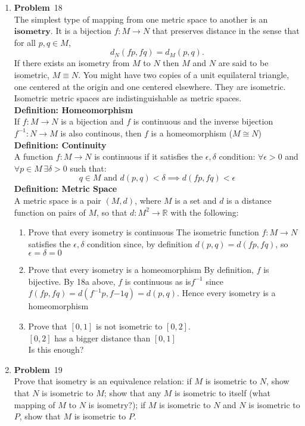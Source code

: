 \documentclass[12pt]{amsart}
\newcommand{\benu}{\begin{enumerate}}
\newcommand{\eenu}{\end{enumerate}}
\theoremstyle{definition}
\newcommand{\mbR}{\mathbb{R}}
\newcommand{\itep}{\item {\bfseries Problem}\ }
\begin{document}
\begin{enumerate}[series=p]
\itep 18\\
The simplest type of mapping from one metric space to another is an $\textbf{isometry}$.  It is a bijection $f:M \rightarrow N$ that preserves distance in the sense that for all $p,q \in M$,
$$d_N(fp, fq) = d_M(p,q).$$
If there exists an isometry from $M$ to $N$ then $M$ and $N$ are said to be isometric, $M \equiv N$.  You might have two copies of a unit equilateral triangle, one centered at the origin and one centered elsewhere.  They are isometric.  Isometric metric spaces are indistinguishable as metric spaces.
\\
\textbf{Definition: Homeomorphism}\\
If $f:M \to N$ is a bijection and $f$ is continuous and the inverse bijection $f^{-1}: N \to M$ is also continous, then $f$ is a homeomorphism ($M \cong N$)
\\
\textbf{Definition: Continuity}\\
A function $f: M \to N$ is continuous if it satisfies the $\epsilon , \delta$ condition: $\forall \epsilon > 0$ and $\forall p \in M \, \exists \delta > 0$ such that:\\
$$ q \in M \text{ and } d(p,q) < \delta \implies d(fp, fq) < \epsilon$$
\textbf{Definition: Metric Space}\\
A metric space is a pair $(M, d)$, where $M$ is a set and $d$ is a distance function on pairs of $M$, so that $d : M^2 \to \mbR$ with the following:
\\
\benu
\item Prove that every isometry is continuous
The isometric function $f: M \to N$ satisfies the $\epsilon , \delta$ condition since, by definition $d(p, q) = d(fp, fq)$, so $\epsilon = \delta = 0$
\item Prove that every isometry is a homeomorphism
By definition, $f$ is bijective.  By 18a above, $f$ is continuous as is$f^{-1}$ since $f(fp, fq) = d(f^{-1}p, f{-1}q) = d(p,q)$.  Hence every isometry is a homeomorphism
\item Prove that $[0,1]$ is not isometric to $[0,2]$.\\
$[0,2]$ has a bigger distance than $[0,1]$\hfill\lightning
\\Is this enough?
\eenu
\newpage
\itep 19\\
Prove that isometry is an equivalence relation: if $M$ is isometric to $N$, show that $N$ is isometric to $M$; show that any $M$ is isometric to itself (what mapping of $M$ to $N$ is isometry?); if $M$ is isometric to $N$ and $N$ is isometric to $P$, show that $M$ is isometric to $P$.

\end{enumerate}
\end{document}
